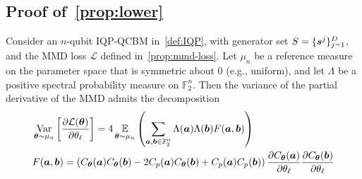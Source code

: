 \documentclass{article}
\theoremstyle{plain}
\theoremstyle{definition}
\theoremstyle{remark}
\begin{document}
\subsection{Proof of~\cref{prop:lower}}
Consider an $n$-qubit IQP-QCBM in~\cref{def:IQP}, with generator set $S=\{{\bm{s}^j}\}_{j=1}^D$, and the MMD loss $\mathcal{L}$ defined in~\cref{prop:mmd-loss}. Let $\mu_n$ be a reference measure on the parameter space that is symmetric about 0 (e.g., uniform), and let $\Lambda$ be a positive spectral probability measure on $\mathbb{F}_2^n$. Then the variance of the partial derivative of the MMD admits the decomposition
\begin{align*}
&\operatorname*{Var}_{{\bm{\theta}}\sim \mu_n} \left[ \frac{\partial \mathcal{L}({\bm{\theta}})}{\partial \theta_\ell} \right]
= 4 \operatorname*{\mathbb{E}}_{{\bm{\theta}}\sim \mu_n} \left( \sum_{{\bm{a}}, {\bm{b}} \in \mathbb{F}_2^n} \Lambda({\bm{a}}) \Lambda({\bm{b}})F({\bm{a}}, {\bm{b}})\right)\\
&F({\bm{a}}, {\bm{b}}) = \left( C_{\bm{\theta}}({\bm{a}}) C_{\bm{\theta}}({\bm{b}}) - 2C_p({\bm{a}}) C_{\bm{\theta}}({\bm{b}}) + C_p({\bm{a}}) C_p({\bm{b}}) \right)\frac{\partial C_{\bm{\theta}}({\bm{a}})}{\partial \theta_\ell} \frac{\partial C_{\bm{\theta}}({\bm{b}})}{\partial \theta_\ell} \nonumber
\end{align*}
\end{document}
